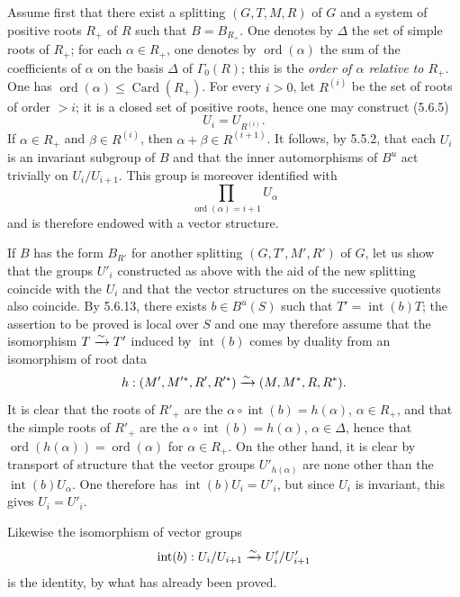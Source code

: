 Assume first that there exist a splitting $(G,T,M,R)$ of $G$ and a system of positive roots $R_+$ of $R$ such that $B=B_{R_+}$. One denotes by $\Delta$ the set of simple roots of $R_+$; for each $\alpha\in R_+$, one denotes by $\operatorname{ord}(\alpha)$ the sum of the coefficients of $\alpha$ on the basis $\Delta$ of $\Gamma_0(R)$; this is the \emph{order of $\alpha$ relative to $R_+$}. One has $\operatorname{ord}(\alpha)\le\operatorname{Card}(R_+)$. For every $i>0$, let $R^{(i)}$ be the set of roots of order $>i$; it is a closed set of positive roots, hence one may construct (5.6.5)
\[
U_i=U_{R^{(i)}}.
\]
If $\alpha\in R_+$ and $\beta\in R^{(i)}$, then $\alpha+\beta\in R^{(i+1)}$. It follows, by 5.5.2, that each $U_i$ is an invariant subgroup of $B$ and that the inner automorphisms of $B^u$ act trivially on $U_i/U_{i+1}$. This group is moreover identified with
\[
\prod_{\operatorname{ord}(\alpha)=i+1}U_\alpha
\]
and is therefore endowed with a vector structure.

If $B$ has the form $B_{R'}$ for another splitting $(G,T',M',R')$ of $G$, let us show that the groups $U'_i$ constructed as above with the aid of the new splitting coincide with the $U_i$ and that the vector structures on the successive quotients also coincide. By 5.6.13, there exists $b\in B^u(S)$ such that $T'=\operatorname{int}(b)T$; the assertion to be proved is local over $S$ and one may therefore assume that the isomorphism $T\xrightarrow{\sim} T'$ induced by $\operatorname{int}(b)$ comes by duality from an isomorphism of root data
\[
h:(M',M'^*,R',R'^*)\xrightarrow{\sim}(M,M^*,R,R^*).
\]
It is clear that the roots of $R'_+$ are the $\alpha\circ\operatorname{int}(b)=h(\alpha)$, $\alpha\in R_+$, and that the simple roots of $R'_+$ are the $\alpha\circ\operatorname{int}(b)=h(\alpha)$, $\alpha\in\Delta$, hence that $\operatorname{ord}(h(\alpha))=\operatorname{ord}(\alpha)$ for $\alpha\in R_+$. On the other hand, it is clear by transport of structure that the vector groups $U'_{h(\alpha)}$ are none other than the $\operatorname{int}(b)U_\alpha$. One therefore has $\operatorname{int}(b)U_i=U'_i$, but since $U_i$ is invariant, this gives $U_i=U'_i$.

Likewise the isomorphism of vector groups
\[
\operatorname{int}(b):U_i/U_{i+1}\xrightarrow{\sim} U'_i/U'_{i+1}
\]
is the identity, by what has already been proved.

